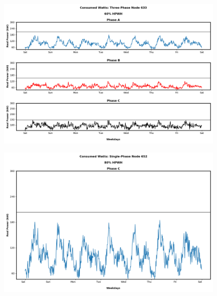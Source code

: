 \begin{figure}[H]
    \centering
    \includegraphics[width=1.1\columnwidth]{Pictures/sixty_three_phase_633_power.png}
    \caption{ }
\end{figure}
\newpage





\begin{figure}[H]
    \centering
    \includegraphics[width=1.1\columnwidth]{Pictures/eighty_single_phase_652_power.png}
    \caption{ }
\end{figure}

\newpage

